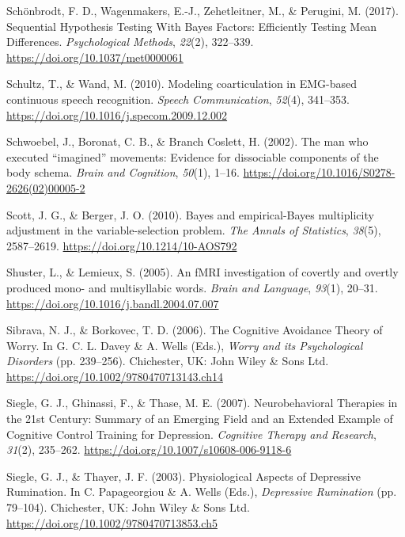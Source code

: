 \documentclass[a4paper,12pt,twoside,openright,oldfontcommands]{memoir}
\begin{document}
\leavevmode\hypertarget{ref-schonbrodt_sequential_2017}{}%
Schönbrodt, F. D., Wagenmakers, E.-J., Zehetleitner, M., \& Perugini, M. (2017). Sequential Hypothesis Testing With Bayes Factors: Efficiently Testing Mean Differences. \emph{Psychological Methods}, \emph{22}(2), 322--339. \url{https://doi.org/10.1037/met0000061}

\leavevmode\hypertarget{ref-schultz_modeling_2010}{}%
Schultz, T., \& Wand, M. (2010). Modeling coarticulation in EMG-based continuous speech recognition. \emph{Speech Communication}, \emph{52}(4), 341--353. \url{https://doi.org/10.1016/j.specom.2009.12.002}

\leavevmode\hypertarget{ref-schwoebel_man_2002}{}%
Schwoebel, J., Boronat, C. B., \& Branch Coslett, H. (2002). The man who executed ``imagined'' movements: Evidence for dissociable components of the body schema. \emph{Brain and Cognition}, \emph{50}(1), 1--16. \url{https://doi.org/10.1016/S0278-2626(02)00005-2}

\leavevmode\hypertarget{ref-scott_bayes_2010}{}%
Scott, J. G., \& Berger, J. O. (2010). Bayes and empirical-Bayes multiplicity adjustment in the variable-selection problem. \emph{The Annals of Statistics}, \emph{38}(5), 2587--2619. \url{https://doi.org/10.1214/10-AOS792}

\leavevmode\hypertarget{ref-shuster_fmri_2005}{}%
Shuster, L., \& Lemieux, S. (2005). An fMRI investigation of covertly and overtly produced mono- and multisyllabic words. \emph{Brain and Language}, \emph{93}(1), 20--31. \url{https://doi.org/10.1016/j.bandl.2004.07.007}

\leavevmode\hypertarget{ref-davey_cognitive_2006}{}%
Sibrava, N. J., \& Borkovec, T. D. (2006). The Cognitive Avoidance Theory of Worry. In G. C. L. Davey \& A. Wells (Eds.), \emph{Worry and its Psychological Disorders} (pp. 239--256). Chichester, UK: John Wiley \& Sons Ltd. \url{https://doi.org/10.1002/9780470713143.ch14}

\leavevmode\hypertarget{ref-siegle_neurobehavioral_2007}{}%
Siegle, G. J., Ghinassi, F., \& Thase, M. E. (2007). Neurobehavioral Therapies in the 21st Century: Summary of an Emerging Field and an Extended Example of Cognitive Control Training for Depression. \emph{Cognitive Therapy and Research}, \emph{31}(2), 235--262. \url{https://doi.org/10.1007/s10608-006-9118-6}

\leavevmode\hypertarget{ref-papageorgiou_physiological_2003}{}%
Siegle, G. J., \& Thayer, J. F. (2003). Physiological Aspects of Depressive Rumination. In C. Papageorgiou \& A. Wells (Eds.), \emph{Depressive Rumination} (pp. 79--104). Chichester, UK: John Wiley \& Sons Ltd. \url{https://doi.org/10.1002/9780470713853.ch5}
\end{document}
